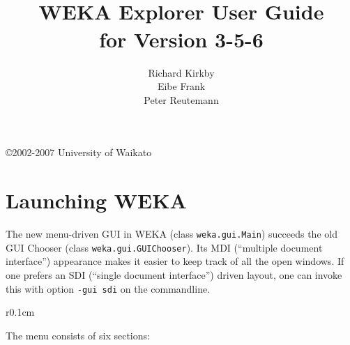 \documentclass[a4paper]{article}
\title{\epsfig{file=images/coat_of_arms.eps,width=10cm}\vspace{3cm}\\WEKA Explorer User Guide\\for Version 3-5-6}
\author{Richard Kirkby\\Eibe Frank\\Peter Reutemann}
\begin{document}
\begin{titlepage}

\maketitle
\thispagestyle{empty}

\center
\vspace{7.5cm}

\copyright 2002-2007 University of Waikato

\end{titlepage}

\tableofcontents

\newpage

\section{Launching WEKA}

The new menu-driven GUI in WEKA (class \texttt{weka.gui.Main}) succeeds the old GUI Chooser (class \texttt{weka.gui.GUIChooser}). Its MDI (``multiple document interface'') appearance makes it easier to keep track of all the open windows. If one prefers an SDI (``single document interface'') driven layout, one can invoke this with option \texttt{-gui sdi} on the commandline.

\begin{center}
\end{center}

\begin{wrapfigure}{r}{0.1cm}
	\vspace{0.2cm}

	\vspace{0.2cm}

	\vspace{0.2cm}

	\vspace{0.2cm}

	\vspace{0.2cm}

	\vspace{0.2cm}
\end{wrapfigure}

The menu consists of six sections:
\end{document}
